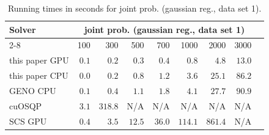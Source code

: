 
\begin{table}[h!]
\begin{center}
  \small
  \begin{tabular}{l*{8}{r}}
    \toprule
    \multirow{2}{*}{Solver} & \multicolumn{7}{c}{joint prob. (gaussian reg., data set 1)} \\
    \cmidrule{2-8}
    & 100 & 300 & 500 & 700 & 1000 & 2000 & 3000 \\
    \midrule
    this paper GPU & $0.1$ & $0.2$ & $0.3$ & $0.4$ & $0.8$ & $4.8$ & $13.0$ \\
    this paper CPU & $0.0$ & $0.2$ & $0.8$ & $1.2$ & $3.6$ & $25.1$ & $86.2$ \\
    GENO CPU & $0.1$ & $0.4$ & $1.1$ & $1.8$ & $4.1$ & $27.7$ & $90.9$ \\
    cuOSQP & $3.1$ & $318.8$ & N/A & N/A & N/A & N/A & N/A \\
    SCS GPU & $0.4$ & $3.5$ & $12.5$ & $36.0$ & $114.1$ & $861.4$ & N/A \\
    \bottomrule
  \end{tabular}%
  \caption{Running times in seconds for joint prob. (gaussian reg., data set 1).}
  \end{center}
\end{table}
